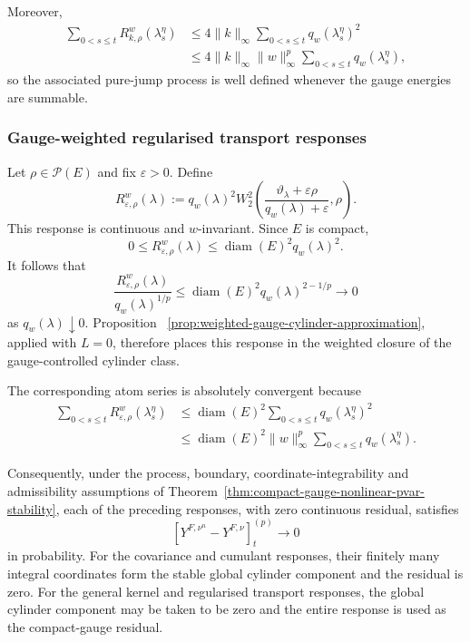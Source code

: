 \documentclass[a4paper,10pt]{article}
\begin{document}
Moreover,
\[
\begin{aligned}
\sum_{0<s\le t}
R_{k,\rho}^w(\lambda_s^\eta)
&\le
4\lVert k\rVert_\infty
\sum_{0<s\le t}q_w(\lambda_s^\eta)^2
\\
&\le
4\lVert k\rVert_\infty
\lVert w\rVert_\infty^p
\sum_{0<s\le t}q_w(\lambda_s^\eta),
\end{aligned}
\]
so the associated pure-jump process is well defined whenever the
gauge energies are summable.

\subsubsection{Gauge-weighted regularised transport responses}

Let \(\rho\in\mathcal P(E)\) and fix \(\varepsilon>0\). Define
\[
R_{\varepsilon,\rho}^w(\lambda)
:=
q_w(\lambda)^2
W_2^2
\left(
\frac{
        \vartheta_\lambda+\varepsilon\rho
}{
        q_w(\lambda)+\varepsilon
},
\rho
\right).
\]
This response is continuous and \(w\)-invariant. Since \(E\) is
compact,
\[
        0
        \le
        R_{\varepsilon,\rho}^w(\lambda)
        \le
        \operatorname{diam}(E)^2q_w(\lambda)^2.
\]
It follows that
\[
\frac{
R_{\varepsilon,\rho}^w(\lambda)
}{
q_w(\lambda)^{1/p}
}
\le
\operatorname{diam}(E)^2
q_w(\lambda)^{2-1/p}
\longrightarrow0
\]
as \(q_w(\lambda)\downarrow0\). Proposition~
\ref{prop:weighted-gauge-cylinder-approximation}, applied with
\(L=0\), therefore places this response in the weighted closure of
the gauge-controlled cylinder class.

The corresponding atom series is absolutely convergent because
\[
\begin{aligned}
\sum_{0<s\le t}
R_{\varepsilon,\rho}^w(\lambda_s^\eta)
&\le
\operatorname{diam}(E)^2
\sum_{0<s\le t}
q_w(\lambda_s^\eta)^2
\\
&\le
\operatorname{diam}(E)^2
\lVert w\rVert_\infty^p
\sum_{0<s\le t}
q_w(\lambda_s^\eta).
\end{aligned}
\]

Consequently, under the process, boundary, coordinate-integrability
and admissibility assumptions of
Theorem~\ref{thm:compact-gauge-nonlinear-pvar-stability}, each of the
preceding responses, with zero continuous residual, satisfies
\[
\left[
Y^{F,\nu^n}
-
Y^{F,\nu}
\right]^{(p)}_t
\longrightarrow0
\]
in probability. For the covariance and cumulant responses, their
finitely many integral coordinates form the stable global cylinder
component and the residual is zero. For the general kernel and
regularised transport responses, the global cylinder component may be
taken to be zero and the entire response is used as the compact-gauge
residual.
\end{document}
